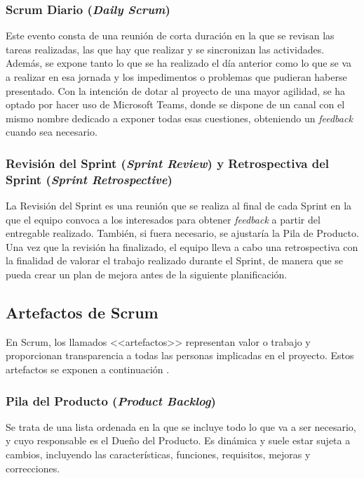 \subsubsection{Scrum Diario (\textit{Daily Scrum})}
Este evento consta de una reunión de corta duración en la que se revisan las tareas realizadas, las que hay que realizar y se sincronizan las actividades. Además, se expone tanto lo que se ha realizado el día anterior como lo que se va a realizar en esa jornada y los impedimentos o problemas que pudieran haberse presentado. Con la intención de dotar al proyecto de una mayor agilidad, se ha optado por hacer uso de Microsoft Teams, donde se dispone de un canal con el mismo nombre dedicado a exponer todas esas cuestiones, obteniendo un \textit{feedback} cuando sea necesario.

\subsubsection{Revisión del Sprint (\textit{Sprint Review}) y Retrospectiva del Sprint (\textit{Sprint Retrospective})}
La Revisión del Sprint es una reunión que se realiza al final de cada Sprint en la que el equipo convoca a los interesados para obtener \textit{feedback} a partir del entregable realizado. También, si fuera necesario, se ajustaría la Pila de Producto. Una vez que la revisión ha finalizado, el equipo lleva a cabo una retrospectiva con la finalidad de valorar el trabajo realizado durante el Sprint, de manera que se pueda crear un plan de mejora antes de la siguiente planificación.


\clearpage


\subsection{Artefactos de Scrum}
En Scrum, los llamados <<artefactos>> representan valor o trabajo y proporcionan transparencia a todas las personas implicadas en el proyecto. Estos artefactos se exponen a continuación \cite{scrumguide}.

\subsubsection{Pila del Producto (\textit{Product Backlog})}
Se trata de una lista ordenada en la que se incluye todo lo que va a ser necesario, y cuyo responsable es el Dueño del Producto. Es dinámica y suele estar sujeta a cambios, incluyendo las características, funciones, requisitos, mejoras y correcciones.

